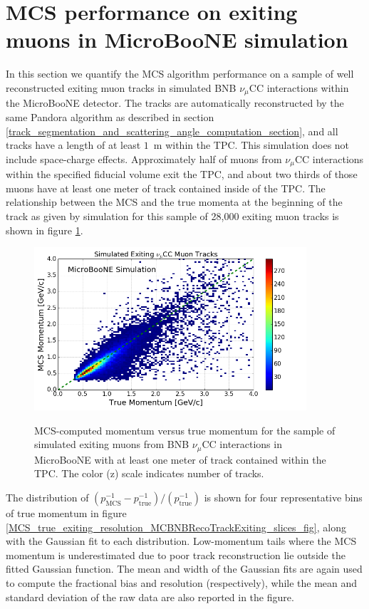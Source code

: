 \documentclass[a4paper,11pt]{article}
\begin{document}
\section{MCS performance on exiting muons in MicroBooNE simulation}
In this section we quantify the MCS algorithm performance on a sample of well reconstructed exiting muon tracks in simulated BNB $\nu_\mu$CC interactions within the MicroBooNE detector. The tracks are automatically reconstructed by the same Pandora algorithm as described in section \ref{track_segmentation_and_scattering_angle_computation_section}, and all tracks have a length of at least $1$~m within the TPC. This simulation does not include space-charge effects. Approximately half of muons from $\nu_\mu$CC interactions within the specified fiducial volume exit the TPC, and about two thirds of those muons have at least one meter of track contained inside of the TPC. The relationship between the MCS and the true momenta at the beginning of the track as given by simulation for this sample of 28,000 exiting muon tracks is shown in figure \ref{MCS_true_comparison_exiting_fig}.\\

\begin{figure}[ht!]
\centering
	\includegraphics[width=0.9\textwidth]{Figures/MCS_true_comparison_MCBNBRecoTrackExiting.png} \\
\caption{MCS-computed momentum versus true momentum for the sample of simulated exiting muons from BNB $\nu_\mu$CC interactions in MicroBooNE with at least one meter of track contained within the TPC. The color (z) scale indicates number of tracks.}\label{MCS_true_comparison_exiting_fig}
\end{figure}

The distribution of $(p_{\text{MCS}}^{-1} - p_{\text{true}}^{-1})/(p_{\text{true}}^{-1})$ is shown for four representative bins of true momentum in figure \ref{MCS_true_exiting_resolution_MCBNBRecoTrackExiting_slices_fig}, along with the Gaussian fit to each distribution. Low-momentum tails where the MCS momentum is underestimated due to poor track reconstruction lie outside the fitted Gaussian function. The mean and width of the Gaussian fits are again used to compute the fractional bias and resolution (respectively), while the mean and standard deviation of the raw data are also reported in the figure.\\
\end{document}
